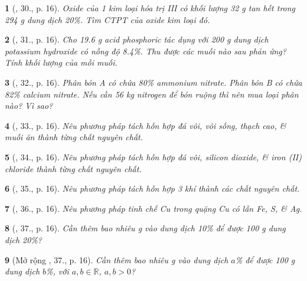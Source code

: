 \documentclass{article}
\newtheorem{baitoan}{}
\begin{document}
\begin{baitoan}[\cite{An_400_BT_Hoa_Hoc_9}, 30., p. 16]
	Oxide của 1 kim loại hóa trị III có khối lượng {\rm32 g} tan hết trong {\rm294 g} dung dịch {\rm{} 20\%}. Tìm {\rm CTPT} của oxide kim loại đó.
\end{baitoan}

\begin{baitoan}[\cite{An_400_BT_Hoa_Hoc_9}, 31., p. 16]
	Cho {\rm19.6 g} acid phosphoric tác dụng với {\rm200 g} dung dịch potassium hydroxide có nồng độ {\rm8.4\%}. Thu được các muối nào sau phản ứng? Tính khối lượng của mỗi muối.
\end{baitoan}

\begin{baitoan}[\cite{An_400_BT_Hoa_Hoc_9}, 32., p. 16]
	Phân bón A có chứa {\rm80\%} ammonium nitrate. Phân bón B có chứa {\rm82\%} calcium nitrate. Nếu cần {\rm56 kg} nitrogen để bón ruộng thì nên mua loại phân nào? Vì sao?
\end{baitoan}

\begin{baitoan}[\cite{An_400_BT_Hoa_Hoc_9}, 33., p. 16]
	Nêu phương pháp tách hỗn hợp đá vôi, vôi sống, thạch cao, \& muối ăn thành từng chất nguyên chất.
\end{baitoan}

\begin{baitoan}[\cite{An_400_BT_Hoa_Hoc_9}, 34., p. 16]
	Nêu phương pháp tách hỗn hợp đá vôi, silicon dioxide, \& iron (II) chloride thành từng chất nguyên chất.
\end{baitoan}

\begin{baitoan}[\cite{An_400_BT_Hoa_Hoc_9}, 35., p. 16]
	Nêu phương pháp tách hỗn hợp 3 khí {\rm{}} thành các chất nguyên chất.
\end{baitoan}

\begin{baitoan}[\cite{An_400_BT_Hoa_Hoc_9}, 36., p. 16]
	Nêu phương pháp tinh chế {\rm Cu} trong quặng {\rm Cu} có lẫn {\rm Fe, S}, \& {\rm Ag}.
\end{baitoan}

\begin{baitoan}[\cite{An_400_BT_Hoa_Hoc_9}, 37., p. 16]
	Cần thêm bao nhiêu {\rm g } vào dung dịch {\rm{} 10\%} để được {\rm100 g} dung dịch {\rm{} 20\%}?
\end{baitoan}

\begin{baitoan}[Mở rộng \cite{An_400_BT_Hoa_Hoc_9}, 37., p. 16]
	Cần thêm bao nhiêu {\rm g } vào dung dịch {\rm{} $a$\%} để được {\rm100 g} dung dịch {\rm{} $b$\%}, với $a,b\in\mathbb{R}$, $a,b > 0$?
\end{baitoan}
\end{document}
